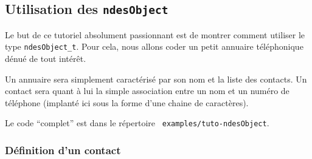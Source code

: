 %
\subsection{Utilisation des {\tt ndesObject}}
\label{subsection:tut-ndesObject}

   Le but de ce tutoriel absolument passionnant est de montrer comment
utiliser le type {\tt ndesObject\_t}. Pour cela, nous allons coder un
petit annuaire téléphonique dénué de tout intérêt.

   Un annuaire sera simplement caractérisé par son nom et la liste des
contacts. Un contact sera quant à lui la simple association entre un
nom et un numéro de téléphone (implanté ici sous la forme d'une chaine
de caractères).

   Le code ``complet'' est dans le répertoire {\tt
examples/tuto-ndesObject}. 

\subsubsection{Définition d'un contact}
